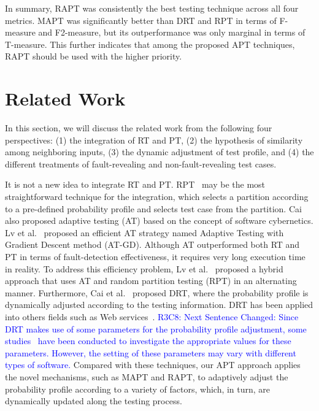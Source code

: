 \documentclass[10pt,journal,compsoc]{IEEEtran}
\begin{document}
In summary, RAPT was consistently the best testing technique across all four metrics. MAPT was significantly better than DRT and RPT in terms of F-measure and F2-measure, but its outperformance was only marginal in terms of T-measure. This further indicates that among the proposed APT techniques, RAPT should be used with the higher priority.

\section{Related Work}
\label{sec:related}

In this section, we will discuss the related work from the following four perspectives: (1) the integration of RT and PT, (2) the hypothesis of similarity among neighboring inputs, (3) the dynamic adjustment of test profile, and (4) the different treatments of fault-revealing and non-fault-revealing test cases.

It is not a new idea to integrate RT and PT. RPT~\cite{Cai05, Cai07} may be the most straightforward technique for the integration, which selects a partition according to a pre-defined probability profile and selects test case from the partition. Cai~\cite{Cai02} also proposed adaptive testing (AT) based on the concept of software cybernetics. Lv et al.~\cite{LvTSE14} proposed an efficient AT strategy named Adaptive Testing with Gradient Descent method (AT-GD). Although AT outperformed both RT and PT in terms of fault-detection effectiveness, it requires very long execution time in reality. To address this efficiency problem, Lv et al.~\cite{Lv14} proposed a hybrid approach that uses AT and random partition testing (RPT) in an alternating manner. Furthermore, Cai et al.~\cite{Cai09} proposed DRT, where the probability profile is dynamically adjusted according to the testing information. DRT has been applied into others fields such as Web services~\cite{Sun12}. \textcolor{blue}{R3C8: Next Sentence Changed: Since DRT makes use of some parameters for the probability profile adjustment, some studies~\cite{Lv11, Yang14, Li15} have been conducted to investigate the appropriate values for these parameters. However, the setting of these parameters may vary with different types of software.}
Compared with these techniques, our APT approach applies the novel mechanisms, such as MAPT and RAPT, to adaptively adjust the probability profile according to a variety of factors, which, in turn, are dynamically updated along the testing process.
\end{document}
